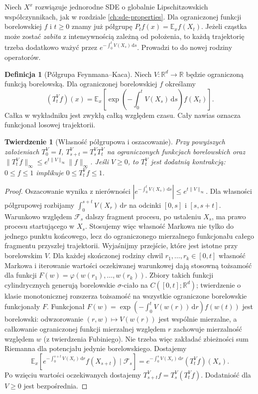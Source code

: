 \documentclass[11pt,a4paper,oneside]{report}
\numberwithin{equation}{chapter}
\theoremstyle{plain}
\newtheorem{twierdzenie}{Twierdzenie}[chapter]
\theoremstyle{definition}
\newtheorem{definicja}{Definicja}[chapter]
\theoremstyle{remark}
\newcommand{\R}{\mathbb{R}}
\newcommand{\E}{\mathbb{E}}
\newcommand{\calF}{\mathcal{F}}
\newcommand{\dd}{\mathrm{d}}
\newcommand{\norm}[1]{\lVert #1\rVert}
\begin{document}
Niech $X^x$ rozwiązuje jednorodne SDE o globalnie
Lipschitzowskich współczynnikach, jak w
rozdziale \ref{ch:sde-properties}. Dla ograniczonej
funkcji borelowskiej $f$ i $t\ge0$ znamy już półgrupę
$P_tf(x)=\E_xf(X_t)$. Jeżeli cząstka może zostać
\emph{zabita} z intensywnością zależną od położenia,
to każdą trajektorię trzeba dodatkowo ważyć przez
$e^{-\int_0^tV(X_s)\,\dd s}$. Prowadzi to do
nowej rodziny operatorów.

\begin{definicja}[Półgrupa Feynmana--Kaca]
\label{def:fk-semigroup}
Niech $V:\R^d\to\R$ będzie ograniczoną funkcją
borelowską. Dla ograniczonej borelowskiej $f$ określamy
\[
(T_t^Vf)(x)=\E_x\left[
\exp\left(-\int_0^tV(X_s)\,\dd s\right)f(X_t)\right].
\]
Całka w wykładniku jest zwykłą całką względem czasu.
Cały nawias oznacza funkcjonał losowej trajektorii.
\end{definicja}

\begin{twierdzenie}[Własność półgrupowa i oszacowanie]
\label{th:fk-semigroup}
Przy powyższych założeniach $T_0^V=I$,
$T_{s+t}^V=T_s^VT_t^V$ na ograniczonych
funkcjach borelowskich oraz
$\norm{T_t^Vf}_\infty\le e^{t\norm V_\infty}\norm f_\infty$.
Jeśli $V\ge0$, to $T_t^V$ jest dodatnią kontrakcją:
$0\le f\le1$ implikuje $0\le T_t^Vf\le1$.
\end{twierdzenie}
\begin{proof}
Oszacowanie wynika z nierówności
$|e^{-\int_0^t V(X_s)\,\dd s}|\le e^{t\norm V_\infty}$.
Dla własności półgrupowej rozbijamy
$\int_0^{s+t}V(X_r)\,\dd r$ na odcinki
$[0,s]$ i $[s,s+t]$. Warunkowo względem $\calF_s$
dalszy fragment procesu, po ustaleniu $X_s$, ma
prawo procesu startującego w $X_s$.
Stosujemy więc własność Markowa nie tylko do
jednego punktu końcowego, lecz do ograniczonego
mierzalnego funkcjonału całego fragmentu przyszłej trajektorii.
Wyjaśnijmy przejście, które jest istotne przy borelowskim $V$.
Dla każdej skończonej rodziny chwil $r_1,\ldots,r_k\in[0,t]$
własność Markowa i iterowanie wartości oczekiwanej warunkowej
dają stosowną tożsamość dla funkcji
$F(w)=\varphi(w(r_1),\ldots,w(r_k))$.
Zbiory takich funkcji cylindrycznych generują borelowskie
$\sigma$-ciało na $C([0,t];\R^d)$; twierdzenie o klasie
monotonicznej rozszerza tożsamość na wszystkie ograniczone
borelowskie funkcjonały $F$. Funkcjonał
$F(w)=\exp(-\int_0^tV(w(r))\,\dd r)f(w(t))$
jest borelowski: odwzorowanie $(r,w)\mapsto V(w(r))$
jest wspólnie mierzalne, a całkowanie ograniczonej funkcji
mierzalnej względem $r$ zachowuje mierzalność względem $w$
(z twierdzenia Fubiniego). Nie trzeba więc zakładać
zbieżności sum Riemanna dla potencjału jedynie borelowskiego.
Dostajemy
\[
\E_x\left[e^{-\int_0^{s+t}V(X_r)\,\dd r}f(X_{s+t})
\mid\calF_s\right]
=e^{-\int_0^sV(X_r)\,\dd r}(T_t^Vf)(X_s).
\]
Po wzięciu wartości oczekiwanych dostajemy
$T_{s+t}^Vf=T_s^V(T_t^Vf)$. Dodatniość dla $V\ge0$
jest bezpośrednia.
\end{proof}
\end{document}
